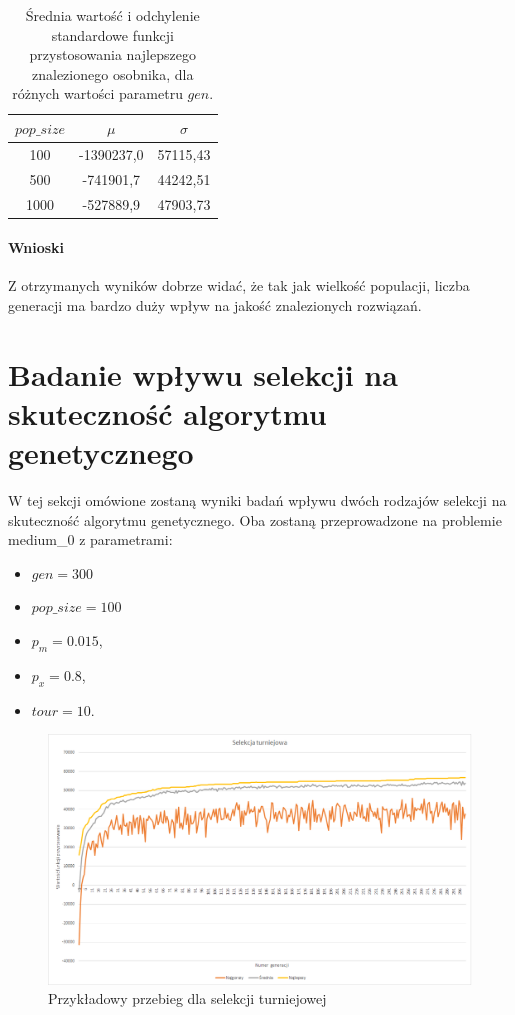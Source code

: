\documentclass{article}
\begin{document}
	\begin{table}[H]
		\begin{center}
			\begin{tabular}{ |c|c|c| } 
				\hline
				$pop\_size$ & $\mu$ & $\sigma$ \\ 
				\hline
				100 & -1390237,0 & 57115,43 \\ 
				500 & -741901,7 & 44242,51 \\ 
				1000 & -527889,9 & 47903,73 \\ 
				\hline
			\end{tabular}
			\caption{Średnia wartość i odchylenie standardowe funkcji przystosowania najlepszego znalezionego osobnika, dla różnych wartości parametru $gen$.}
			\label{tab:gen}
		\end{center}
	\end{table}
	
	\paragraph{Wnioski}
	Z otrzymanych wyników dobrze widać, że tak jak wielkość populacji, liczba generacji ma bardzo duży wpływ na jakość znalezionych rozwiązań.
	
	\section{Badanie wpływu selekcji na skuteczność \mbox{algorytmu} genetycznego}
	W tej sekcji omówione zostaną wyniki badań wpływu dwóch rodzajów selekcji na skuteczność algorytmu genetycznego. Oba zostaną przeprowadzone na problemie medium\_0 z parametrami:
	\begin{itemize}
		\item $gen = 300$
		\item $pop\_size = 100$
		\item $p_m = 0.015$,
		\item $p_x = 0.8$,
		\item $tour = 10$.
	\end{itemize}

	\begin{figure}[H]
		\centering
		\includegraphics[width=1\linewidth]{tour.png}
		\caption{Przykładowy przebieg dla selekcji turniejowej}
		\label{fig:tour}
	\end{figure}
\end{document}
